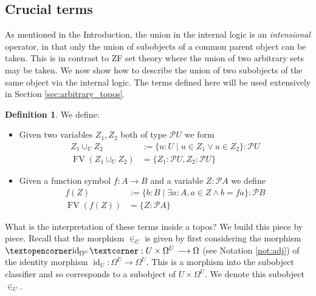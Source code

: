 \documentclass{birkjour}
\theoremstyle{plain}
\theoremstyle{definition}
\newtheorem{definition}[thm]{Definition} %
\newcommand{\call}[1]{\mathcal{#1}}
\newcommand{\adj}[1]{\text{\textopencorner}{#1}\text{\textcorner}}
\newcommand{\lto}{\longrightarrow}
\begin{document}
	\subsection{Crucial terms}\label{sec:crucial_terms}
	As mentioned in the Introduction, the union in the internal logic is an \emph{intensional} operator, in that only the union of subobjects of a common parent object can be taken. This is in contrast to ZF set theory where the union of two arbitrary sets may be taken. We now show how to describe the union of two subobjects of the same object via the internal logic. The terms defined here will be used extensively in Section \ref{sec:arbitrary_topos}.
	\begin{definition}\label{def:crucial_terms}
		We define:
		\begin{itemize}
			\item Given two variables $Z_1,Z_2$ both of type $\call{P}U$ we form
			\begin{align}
					Z_1 \cup_U Z_2 &:= \lbrace u:U \mid u \in Z_1 \vee u \in Z_2\rbrace : \call{P}U\\
					\operatorname{FV}(Z_1 \cup_U Z_2) &= \lbrace Z_1 : \call{P}U, Z_2 : \call{P}U\rbrace 
			\end{align}
			\item Given a function symbol $f: A \lto B$ and a variable $Z : \call{P}A$ we define
			\begin{align}
					f(Z) &:= \lbrace b : B \mid \exists a : A, a \in Z \wedge b = fa\rbrace: \call{P}B\\
					\operatorname{FV}(f(Z)) &= \lbrace Z: \call{P}A\rbrace
			\end{align}
		\end{itemize}
	\end{definition}
	What is the interpretation of these terms inside a topos? We build this piece by piece. Recall that the morphism $\in_U$ is given by first considering the morphism $\adj{\operatorname{id}_{\Omega^U}}: U \times \Omega^U \lto \Omega$ (see Notation \ref{not:adj}) of the identity morphism $\operatorname{id}_U: \Omega^U \lto \Omega^U$. This is a morphism into the subobject classifier and so corresponds to a subobject of $U \times \Omega^U$. We denote this subobject $\in_U$.
\end{document}
